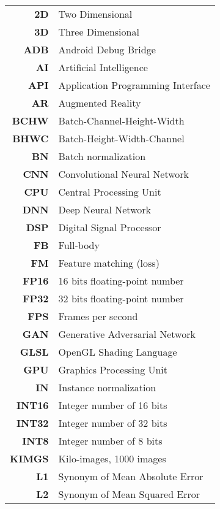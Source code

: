 \begin{changemargin}{-1.5cm}{0cm}
\begin{tabular}{@{}>{\bf}r l}
	2D & Two Dimensional \\
	3D & Three Dimensional \\
	ADB & Android Debug Bridge \\
	AI & Artificial Intelligence \\
	API & Application Programming Interface \\
	AR & Augmented Reality \\
	BCHW & Batch-Channel-Height-Width \\
	BHWC & Batch-Height-Width-Channel \\
	BN & Batch normalization \\
	CNN & Convolutional Neural Network \\
	CPU & Central Processing Unit \\
	DNN & Deep Neural Network \\
	DSP & Digital Signal Processor \\
	FB & Full-body \\
	FM & Feature matching (loss) \\
	FP16 & 16 bits floating-point number \\
	FP32 & 32 bits floating-point number \\
	FPS & Frames per second\\
	GAN & Generative Adversarial Network \\
	GLSL & OpenGL Shading Language \\
	GPU & Graphics Processing Unit \\
	IN & Instance normalization \\
	INT16 & Integer number of 16 bits \\
	INT32 & Integer number of 32 bits \\
	INT8 & Integer number of 8 bits \\
	KIMGS & Kilo-images, 1000 images \\
	L1 & Synonym of Mean Absolute Error \\
	L2 & Synonym of Mean Squared Error \\	
\end{tabular}
\hspace{-1em}

\end{changemargin}
